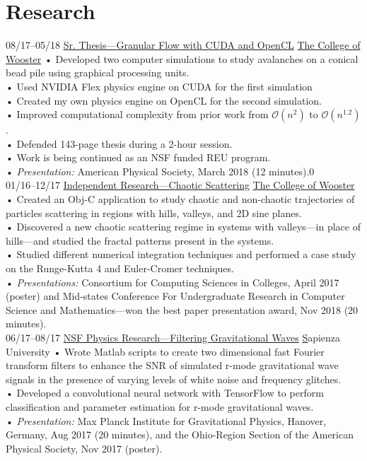 \documentclass[]{friggeri-cv}
\newcommand{\bigO}{\mathcal{O}}
\begin{document}
\section{Research}
\begin{entrylist}
\entry
    {08/17–05/18}
    {\href{}{Sr. Thesis—Granular Flow with CUDA and OpenCL}}
    {\href{https://www.wooster.edu/}{The College of Wooster}}
    {
    •   Developed two computer simulations to study avalanches on a conical bead pile using graphical processing units.\\
    •   Used NVIDIA Flex physics engine on CUDA for the first simulation \\
    •   Created my own physics engine on OpenCL for the second simulation.\\
    •   Improved computational complexity from prior work from $\bigO(n^2)$ to $\bigO(n^{1.2})$.\\
    •   Defended 143-page thesis during a 2-hour session.\\
    •	Work is being continued as an NSF funded REU program.\\
    •	\emph{Presentation:} American Physical Society, March 2018 (12 minutes).0\\}
\entry
    {01/16–12/17}
    {\href{https://github.com/avivajpeyi/Chaos_CS200}{Independent Research—Chaotic Scattering}}
    {\href{https://www.wooster.edu/}{The College of Wooster}}
    {
    •	Created an Obj-C application to study chaotic and non-chaotic trajectories of particles scattering in regions with hills, valleys, and 2D sine planes. \\
    •	Discovered a new chaotic scattering regime in systems with valleys—in place of hills—and studied the fractal patterns present in the systems. \\
    •	Studied different numerical integration techniques and performed a case study on the Runge-Kutta 4 and Euler-Cromer techniques.\\
    •	\emph{Presentations:} Consortium for Computing Sciences in Colleges, April 2017 (poster) and Mid-states Conference For Undergraduate Research in Computer Science and Mathematics—won the best paper presentation award, Nov 2018 (20 minutes).\\ }
\entry
    {06/17–08/17}
    {\href{http://meetings.aps.org/Meeting/OSF17/Session/D1.18}{NSF Physics Research—Filtering Gravitational Waves}}
    {\href{http://en.uniroma1.it/}Sapienza University}
    {•	Wrote Matlab scripts to create two dimensional fast Fourier transform filters to enhance the SNR of simulated r-mode gravitational wave signals in the presence of varying levels of white noise and frequency glitches.\\
    •	Developed a convolutional neural network with TensorFlow to perform classification and parameter estimation for r-mode gravitational waves. \\
    •	\emph{Presentation:} Max Planck Institute for Gravitational Physics, Hanover, Germany, Aug 2017 (20 minutes), and the Ohio-Region Section of the American Physical Society, Nov 2017 (poster).\\ }


\end{entrylist}
\end{document}
